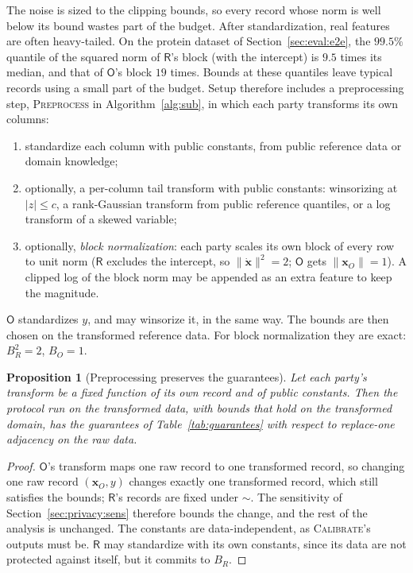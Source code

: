 \documentclass[11pt]{article}
\theoremstyle{definition}
\theoremstyle{plain}
\newtheorem{proposition}{Proposition}[section]
\newcommand{\bx}{\mathbf{x}}
\newcommand{\bxd}{\dot{\mathbf{x}}}
\newcommand{\Party}[1]{\textsf{#1}}
\newcommand{\Rp}{\Party{R}}
\newcommand{\Op}{\Party{O}}
\begin{document}
The noise is sized to the clipping bounds, so every record whose norm is well below its bound wastes part of the budget. After standardization, real features are often heavy-tailed. On the protein dataset of Section~\ref{sec:eval:e2e}, the $99.5\%$ quantile of the squared norm of $\Rp$'s block (with the intercept) is $9.5$ times its median, and that of $\Op$'s block $19$ times. Bounds at these quantiles leave typical records using a small part of the budget. Setup therefore includes a preprocessing step, \textsc{Preprocess} in Algorithm~\ref{alg:sub}, in which each party transforms its own columns:
\begin{enumerate}[noitemsep, label=(\roman*)]
  \item standardize each column with public constants, from public reference data or domain knowledge;
  \item optionally, a per-column tail transform with public constants: winsorizing at $|z| \le c$, a rank-Gaussian transform from public reference quantiles, or a log transform of a skewed variable;
  \item optionally, \emph{block normalization}: each party scales its own block of every row to unit norm ($\Rp$ excludes the intercept, so $\|\bxd\|^2 = 2$; $\Op$ gets $\|\bx_O\| = 1$). A clipped log of the block norm may be appended as an extra feature to keep the magnitude.
\end{enumerate}
$\Op$ standardizes $y$, and may winsorize it, in the same way. The bounds are then chosen on the transformed reference data. For block normalization they are exact: $B_R^2 = 2$, $B_O = 1$.

\begin{proposition}[Preprocessing preserves the guarantees]
\label{prop:preproc}
Let each party's transform be a fixed function of its own record and of public constants. Then the protocol run on the transformed data, with bounds that hold on the transformed domain, has the guarantees of Table~\ref{tab:guarantees} with respect to replace-one adjacency on the raw data.
\end{proposition}

\begin{proof}
$\Op$'s transform maps one raw record to one transformed record, so changing one raw record $(\bx_O, y)$ changes exactly one transformed record, which still satisfies the bounds; $\Rp$'s records are fixed under $\sim$. The sensitivity of Section~\ref{sec:privacy:sens} therefore bounds the change, and the rest of the analysis is unchanged. The constants are data-independent, as \textsc{Calibrate}'s outputs must be. $\Rp$ may standardize with its own constants, since its data are not protected against itself, but it commits to $B_R$.
\end{proof}
\end{document}
